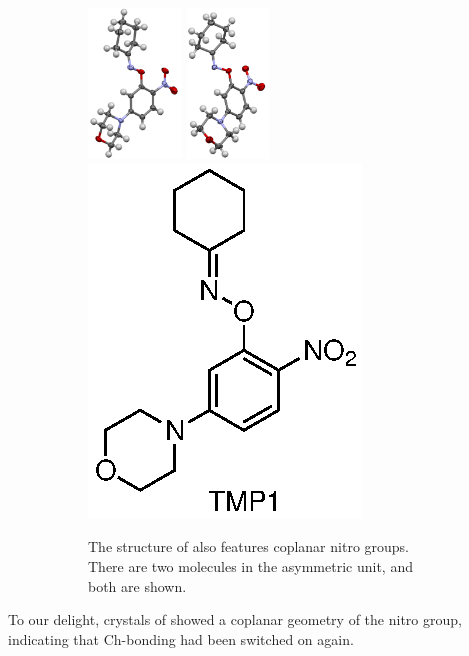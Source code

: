 \begin{refsection}
\begin{figure}
    \begin{subfigure}{\linewidth}
        \centering
        \includegraphics[height=4cm]{Figures/cyclohexanone-oxime-2n-5mpa.pdf}
        \includegraphics[height=4cm]{Figures/cyclohexanone-oxime-2n-5mpb.pdf}
        \includegraphics[scale=0.74]{Figures/cyclohexanone-oxime-2n-5mp.eps}
        \caption[Structure of .]{The structure of  also features coplanar nitro groups. There are two molecules in the asymmetric unit, and both are shown.}\label{fig:cyclohexanone-oxime-2n-5mp}
    \end{subfigure}
    \caption{}
\end{figure}

To our delight, crystals of  showed a coplanar geometry of the nitro group, indicating that Ch-bonding had been switched on again.



\printbibliography
\end{refsection}
